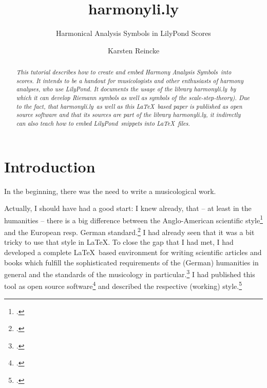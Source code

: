 \documentclass[
  DIV=calc,
  BCOR=5mm,
  12pt,
  headings=small,
  oneside,
  abstract=true,
  toc=bib,
  xcolor=dvipsnames,
  openany,
  ngerman,english]{scrartcl}
\newcommand{\acc}[0]{\textit}
\newcommand{\hlyn}[0]{\textit{harmonyli.ly}}
\newcommand{\lily}[0]{\textit{LilyPond}}
\newcommand{\has}[1]{\textit{Harmony Analysis Symbol#1}}
\begin{document}
\nocite{*}

\titlehead{Tutorial}
\subject{Release }
\title{harmonyli.ly}
\subtitle{Harmonical Analysis Symbols in LilyPond Scores}
\author{Karsten Reincke}


\maketitle

\begin{abstract}
\noindent \itshape
This tutorial describes how to create and embed \has{s}\ into scores. It
intends to be a handout for musicologists and other enthusiasts of harmony
analyses, who use \lily. It documents the usage of the library \hlyn\ by which
it can develop \acc{Riemann} symbols as well as symbols of the
\acc{scale-step-theory}). Due to the fact, that \hlyn\ as well as this \LaTeX\ 
based paper is published as open source software and that its sources are part
of the library \hlyn, it indirectly can also teach how to embed \lily\ snippets
into \LaTeX\ files.
\end{abstract}


\footnotesize
\tableofcontents

\normalsize

\section{Introduction}

In the beginning, there was the need to write a musicological work.

Actually, I should have had a good start: I knew already, that -- at least in
the humanities -- there is a big difference between the Anglo-American
scientific style\footcite[cf.][619ff]{ChMaStyle2010a} and the European resp.
German standard.\footcite[cf.][147ff]{Theisen2013a} I had already seen that it
was a bit tricky to use that style in \LaTeX. To close the gap that I had met, I
had developed a complete \LaTeX\ based environment for writing scientific
articles and books which fulfill the sophisticated requirements of the (German)
humanities in general and the standards of the musicology in
particular.\footcite[cf.][\nopage wp]{reincke2018a} I had published this tool as
open source software\footcite[cf.][\nopage wp]{reincke2018c} and described the
respective (working) style.\footcite[cf.][\nopage]{reincke2018b}
\end{document}
